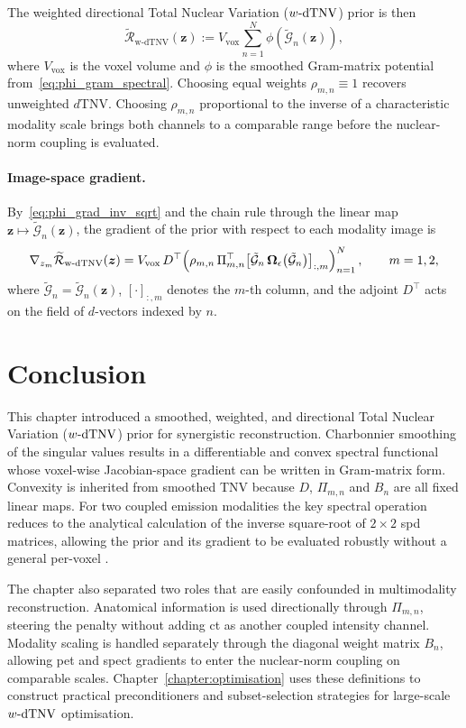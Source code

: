 The weighted directional Total Nuclear Variation ($w\text{-}\mathrm{dTNV}$) prior is then
\begin{equation}
    \widetilde{\mathcal{R}}_{\mathrm{w\text{-}dTNV}}(\bm{z})
    :=
    V_{\mathrm{vox}}\sum_{n=1}^{N} \phi\!\left(\tilde{\mathcal{G}}_n(\bm{z})\right),
    \label{eq:wdtnv_prior}
\end{equation}
where $V_{\mathrm{vox}}$ is the voxel volume and $\phi$ is the smoothed Gram-matrix potential from~\eqref{eq:phi_gram_spectral}. Choosing equal weights $\rho_{m,n}\equiv 1$ recovers unweighted $d$TNV. Choosing $\rho_{m,n}$ proportional to the inverse of a characteristic modality scale brings both channels to a comparable range before the nuclear-norm coupling is evaluated. 

\paragraph{Image-space gradient.}
By~\eqref{eq:phi_grad_inv_sqrt} and the chain rule through the linear map $\bm{z}\mapsto\tilde{\mathcal{G}}_n(\bm{z})$, the gradient of the prior with respect to each modality image is
\begin{equation}
    \nabla_{z_m}\widetilde{\mathcal{R}}_{\mathrm{w\text{-}dTNV}}(\bm{z})
    =
    V_{\mathrm{vox}}\,D^\top\!\left(\rho_{m,n}\,\Pi_{m,n}^\top
    \bigl[\tilde{\mathcal{G}}_n\,\bm{\Omega}_{\epsilon}\!\left(\tilde{\mathcal{G}}_n\right)\bigr]_{:,m}\right)_{n=1}^{N},
    \qquad m=1,2,
    \label{eq:wdtnv_gradient}
\end{equation}
where $\tilde{\mathcal{G}}_n=\tilde{\mathcal{G}}_n(\bm{z})$, $[\cdot]_{:,m}$ denotes the $m$-th column, and the adjoint $D^\top$ acts on the field of $d$-vectors indexed by $n$.

\section{Conclusion}

This chapter introduced a smoothed, weighted, and directional Total Nuclear Variation ($w\text{-}\mathrm{dTNV}$) prior for synergistic reconstruction. Charbonnier smoothing of the singular values results in a differentiable and convex spectral functional whose voxel-wise Jacobian-space gradient can be written in Gram-matrix form. Convexity is inherited from smoothed TNV because $D$, $\Pi_{m,n}$ and $B_n$ are all fixed linear maps. For two coupled emission modalities the key spectral operation reduces to the analytical calculation of the inverse square-root of   $2\times2$ \gls{spd} matrices, allowing the prior and its gradient to be evaluated robustly without a general per-voxel .

The chapter also separated two roles that are easily confounded in multimodality reconstruction. Anatomical information is used directionally through $\Pi_{m,n}$, steering the penalty without adding \gls{ct} as another coupled intensity channel. Modality scaling is handled separately through the diagonal weight matrix $B_n$, allowing \gls{pet} and \gls{spect} gradients to enter the nuclear-norm coupling on comparable scales. Chapter~\ref{chapter:optimisation} uses these definitions to construct practical preconditioners and subset-selection strategies for large-scale $w\text{-}\mathrm{dTNV}$ optimisation.
